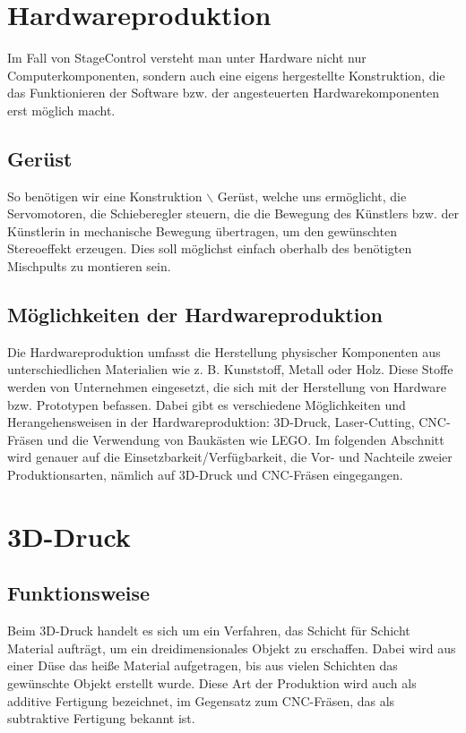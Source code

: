 \section{Hardwareproduktion }
Im Fall von StageControl versteht man unter Hardware nicht nur Computerkomponenten, sondern auch eine eigens hergestellte Konstruktion, die das Funktionieren der Software bzw. der angesteuerten Hardwarekomponenten erst möglich macht.

\subsection{Gerüst}
So benötigen wir eine Konstruktion $\backslash$ Gerüst, welche uns ermöglicht, die Servomotoren, die Schieberegler steuern, die die Bewegung des Künstlers bzw. der Künstlerin in mechanische Bewegung übertragen, um den gewünschten Stereoeffekt erzeugen. Dies soll möglichst einfach oberhalb des benötigten Mischpults zu montieren sein.


\subsection{Möglichkeiten der Hardwareproduktion}
Die Hardwareproduktion umfasst die Herstellung physischer Komponenten aus unterschiedlichen Materialien wie z. B. Kunststoff, Metall oder Holz. Diese Stoffe werden von Unternehmen eingesetzt, die sich mit der Herstellung von Hardware bzw. Prototypen befassen. Dabei gibt es verschiedene Möglichkeiten und Herangehensweisen in der Hardwareproduktion: 3D-Druck, Laser-Cutting, CNC-Fräsen und die Verwendung von Baukästen wie LEGO. Im folgenden Abschnitt wird genauer auf die Einsetzbarkeit/Verfügbarkeit, die Vor- und Nachteile zweier Produktionsarten, nämlich auf 3D-Druck und CNC-Fräsen eingegangen.

\section{3D-Druck}
\subsection{Funktionsweise}
Beim 3D-Druck handelt es sich um ein Verfahren, das Schicht für Schicht Material aufträgt, um ein dreidimensionales Objekt zu erschaffen. Dabei wird aus einer Düse das heiße Material aufgetragen, bis aus vielen Schichten das gewünschte Objekt erstellt wurde. Diese Art der Produktion wird auch als additive Fertigung bezeichnet, im Gegensatz zum CNC-Fräsen, das als subtraktive Fertigung bekannt ist.


